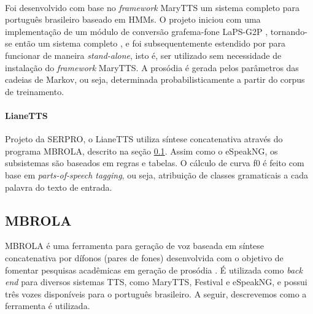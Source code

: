 
\paragraph{\cite{couto}}
Foi desenvolvido com base no \emph{framework} MaryTTS um sistema completo para
português brasileiro baseado em HMMs. O projeto iniciou com uma implementação
de um módulo de conversão grafema-fone LaPS-G2P \cite{g2pusp}, tornando-se então
um sistema completo \cite{couto}, e foi subsequentemente estendido por
 para funcionar de maneira \emph{stand-alone}, isto é, ser utilizado
sem necessidade de instalação do \emph{framework} MaryTTS. A prosódia é gerada
pelos parâmetros das cadeias de Markov, ou seja, determinada probabilisticamente
a partir do corpus de treinamento.


\paragraph{LianeTTS \cite{lianetts}}
Projeto da SERPRO, o LianeTTS utiliza síntese concatenativa através do programa
MBROLA, descrito na seção \ref{sec:mbrola}. Assim como o eSpeakNG, os
subsistemas são baseados em regras e tabelas. O cálculo de curva f0 é feito com
base em \emph{parts-of-speech tagging}, ou seja, atribuição de classes
gramaticais a cada palavra do texto de entrada.

\subsection{MBROLA}
\label{sec:mbrola}
MBROLA é uma ferramenta para geração de voz baseada em síntese concatenativa por
dífonos (pares de fones) desenvolvida com o objetivo de fomentar pesquisas
acadêmicas em geração de prosódia \cite{mbrola}. É utilizada como
\emph{back end} para diversos sistemas TTS, como MaryTTS, Festival
\cite{festival} e eSpeakNG, e possui três vozes disponíveis para o português
brasileiro. A seguir, descrevemos como a ferramenta é utilizada. %

